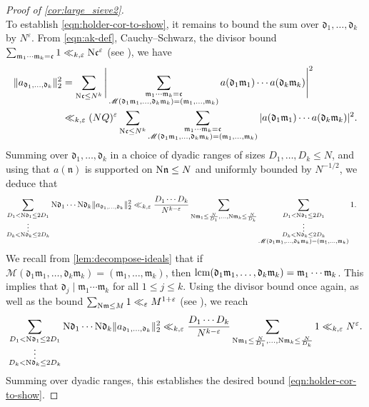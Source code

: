\documentclass[11pt]{amsart}
\theoremstyle{remark}
\numberwithin{equation}{section}
\newcommand{\kc}{\mathfrak{c}}
\newcommand{\kd}{\mathfrak{d}}
\newcommand{\m}{\mathfrak{m}}
\newcommand{\km}{\mathfrak{m}}
\newcommand{\kn}{\mathfrak{n}}
\newcommand{\N}{\textnormal{N}}
\newcommand{\lcm}{\textnormal{lcm}}
\renewcommand{\epsilon}{\varepsilon}
\begin{document}
\begin{proof}[Proof of \cref{cor:large_sieve2}]
\[\]
To establish \eqref{eqn:holder-cor-to-show}, it remains to bound the sum over $\kd_1, \ldots, \kd_k$ by $N^{\epsilon}$. From \eqref{eqn:ak-def}, Cauchy--Schwarz, the divisor bound $\sum_{\km_1\cdots \km_k=\kc} 1 \ll_{k,\epsilon} \N\kc^{\epsilon}$ (see \cite{Weiss}), we have
\[
\begin{aligned}
    \|a_{\kd_1,\ldots,\kd_k}\|_2^2
    &=
    \sum_{\N \kc \le N^k} \Bigg\vert \sum_{\substack{\km_1 \cdots \km_k = \kc \\ \mathscr{M}(\kd_1\km_1, \ldots, \kd_k\km_k) = (\km_1, \ldots, \km_k)}} a(\kd_1\km_1) \cdots a(\kd_k\km_k) \Bigg\vert^2
    \\
    &\ll_{k,\epsilon} (NQ)^{\epsilon}
    \sum_{\N \kc \le N^k} \sum_{\substack{\km_1 \cdots \km_k = \kc \\ \mathscr{M}(\kd_1\km_1, \ldots, \kd_k\km_k) = (\km_1, \ldots, \km_k)}} |a(\kd_1\km_1) \cdots a(\kd_k\km_k)|^2.
\end{aligned}
\]
Summing over $\kd_1, \ldots, \kd_k$ in a choice of dyadic ranges of sizes $D_1, \ldots, D_k \le N$, and using that $a(\kn)$ is supported on $\N\kn \le N$ and uniformly bounded by $N^{-1/2}$, we deduce that
\[
\begin{aligned}
    \sum_{\substack{D_1 < \N\kd_1 \le 2D_1 \\ \vdots \\ D_k < \N \kd_k \le 2D_k}} \N\kd_1 \cdots \N\kd_k \|a_{\kd_1,\ldots,\kd_k}\|_2^2
    &\ll_{k,\epsilon} 
    \frac{D_1\cdots D_k}{N^{k-\epsilon}}
    \sum_{\N\m_1 \le \frac{N}{D_1}, \ldots, \N\m_k \le \frac{N}{D_k}} \sum_{\substack{D_1 < \N\kd_1 \le 2D_1 \\ \vdots \\ D_k < \N \kd_k \le 2D_k \\ \mathscr{M}(\kd_1\km_1, \ldots, \kd_k\km_k) = (\km_1, \ldots, \km_k)}} 1.
\end{aligned}
\]
We recall from \cref{lem:decompose-ideals} that if $\mathscr{M}(\kd_1\km_1, \ldots, \kd_k\km_k) = (\km_1, \ldots, \km_k)$, then $\lcm(\kd_1\km_1, \ldots, \kd_k\km_k) = \km_1 \cdots \km_k$. This implies that $\kd_j \mid \km_1 \cdots \km_k$ for all $1 \le j \le k$. Using the divisor bound once again, as well as the bound $\sum_{\N\km \le M} 1 \ll_{\epsilon} M^{1+\epsilon}$ (see \cite{Weiss}), we reach
\[
    \sum_{\substack{D_1 < \N\kd_1 \le 2D_1 \\ \vdots \\ D_k < \N \kd_k \le 2D_k}} \N\kd_1 \cdots \N\kd_k \|a_{\kd_1,\ldots,\kd_k}\|_2^2
    \ll_{k,\epsilon} \frac{D_1\cdots D_k}{N^{k-\epsilon}}
    \sum_{\N\m_1 \le \frac{N}{D_1}, \ldots, \N\m_k \le \frac{N}{D_k}} 1
    \ll_{k,\epsilon} N^{\epsilon}.
\]
Summing over dyadic ranges, this establishes the desired bound \eqref{eqn:holder-cor-to-show}.
\end{proof}
\end{document}
